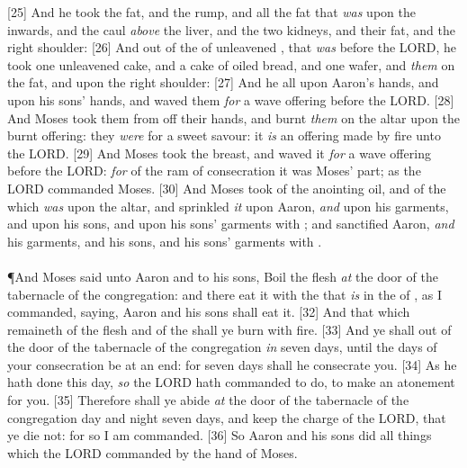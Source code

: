 [25] \textcolor[cmyk]{0.99998,1,0,0}{And he took the fat, and the rump, and all the fat that \emph{was} upon the inwards, and the caul \emph{above} the liver, and the two kidneys, and their fat, and the right shoulder:}
[26] \textcolor[cmyk]{0.99998,1,0,0}{And out of the  of unleavened , that \emph{was} before the LORD, he took one unleavened cake, and a cake of oiled bread, and one wafer, and  \emph{them} on the fat, and upon the right shoulder:}
[27] \textcolor[cmyk]{0.99998,1,0,0}{And he  all upon Aaron's hands, and upon his sons' hands, and waved them \emph{for} a wave offering before the LORD.}
[28] \textcolor[cmyk]{0.99998,1,0,0}{And Moses took them from off their hands, and burnt \emph{them} on the altar upon the burnt offering: they \emph{were}  for a sweet savour: it \emph{is} an offering made by fire unto the LORD.}
[29] \textcolor[cmyk]{0.99998,1,0,0}{And Moses took the breast, and waved it \emph{for} a wave offering before the LORD: \emph{for} of the ram of consecration it was Moses' part; as the LORD commanded Moses.}
[30] \textcolor[cmyk]{0.99998,1,0,0}{And Moses took of the anointing oil, and of the  which \emph{was} upon the altar, and sprinkled \emph{it} upon Aaron, \emph{and} upon his garments, and upon his sons, and upon his sons' garments with ; and sanctified Aaron, \emph{and} his garments, and his sons, and his sons' garments with .}\\
\\
\P \textcolor[cmyk]{0.99998,1,0,0}{And Moses said unto Aaron and to his sons, Boil the flesh \emph{at} the door of the tabernacle of the congregation: and there eat it with the  that \emph{is} in the  of , as I commanded, saying, Aaron and his sons shall eat it.}
[32] \textcolor[cmyk]{0.99998,1,0,0}{And that which remaineth of the flesh and of the  shall ye burn with fire.}
[33] \textcolor[cmyk]{0.99998,1,0,0}{And ye shall  out of the door of the tabernacle of the congregation \emph{in} seven days, until the days of your consecration be at an end: for seven days shall he consecrate you.}
[34] \textcolor[cmyk]{0.99998,1,0,0}{As he hath done this day, \emph{so} the LORD hath commanded to do, to make an atonement for you.}
[35] \textcolor[cmyk]{0.99998,1,0,0}{Therefore shall ye abide \emph{at} the door of the tabernacle of the congregation day and night seven days, and keep the charge of the LORD, that ye die not: for so I am commanded.}
[36] \textcolor[cmyk]{0.99998,1,0,0}{So Aaron and his sons did all things which the LORD commanded by the hand of Moses.}